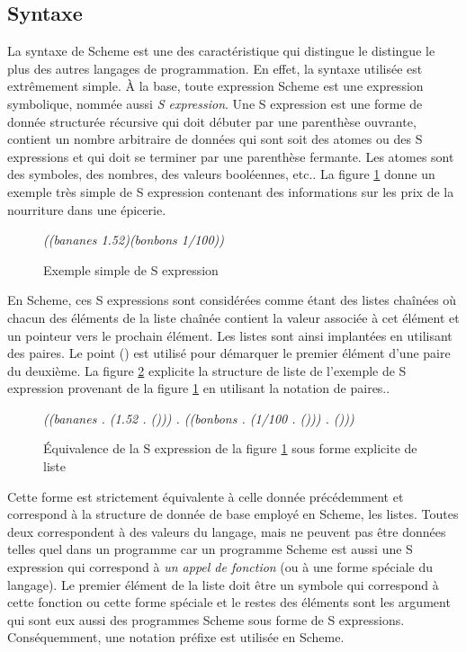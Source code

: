 \documentclass[12pt,oneside,letterpaper,francais]{book}
\newcommand{\scheme}[1]{\selectlanguage{english}{\tt #1}\selectlanguage{french}}
\newcommand{\schemeresult}[1]{{\it #1}}
\begin{document}
\subsection{Syntaxe}
La syntaxe de Scheme est une des caractéristique qui distingue le
distingue le plus des autres langages de programmation. En effet, la
syntaxe utilisée est extrêmement simple. À la base, toute expression
Scheme est une expression symbolique, nommée aussi \textit{S
  expression}. Une S expression est une forme de donnée structurée
récursive qui doit débuter par une parenthèse ouvrante, contient un
nombre arbitraire de données qui sont soit des atomes ou des S
expressions et qui doit se terminer par une parenthèse fermante. Les
atomes sont des symboles, des nombres, des valeurs booléennes,
etc.. La figure \ref{FIG:sexp} donne un exemple très simple de S
expression contenant des informations sur les prix de la nourriture
dans une épicerie.\\

\begin{figure}[htb!]
  \schemeresult{((bananes 1.52)(bonbons 1/100))}
  \caption{Exemple simple de S expression}
  \label{FIG:sexp}
\end{figure}

En Scheme, ces S expressions sont considérées comme étant des listes
chaînées où chacun des éléments de la liste chaînée contient la valeur
associée à cet élément et un pointeur vers le prochain élément. Les
listes sont ainsi implantées en utilisant des paires. Le point
(\scheme{.}) est utilisé pour démarquer le premier élément d'une paire
du deuxième. La figure \ref{FIG:sexp->list} explicite la structure de
liste de l'exemple de S expression provenant de la figure
\ref{FIG:sexp} en utilisant la notation de paires..\\


\begin{figure}[htb!]
{{\it
    ((bananes . (1.52 . ())) . ((bonbons . (1/100 . ())) . ()))
    }}
  \caption{Équivalence de la S expression de la figure \ref{FIG:sexp}
    sous forme explicite de liste}
  \label{FIG:sexp->list}
\end{figure}

Cette forme est strictement équivalente à celle donnée précédemment et
correspond à la structure de donnée de base employé en Scheme, les
listes. Toutes deux correspondent à des valeurs du langage, mais ne
peuvent pas être données telles quel dans un programme car un
programme Scheme est aussi une S expression qui correspond à \emph{un
  appel de fonction} (ou à une forme spéciale du langage). Le premier
élément de la liste doit être un symbole qui correspond à cette
fonction ou cette forme spéciale et le restes des éléments sont les
argument qui sont eux aussi des programmes Scheme sous forme de S
expressions. Conséquemment, une notation préfixe est utilisée en
Scheme.
\end{document}
